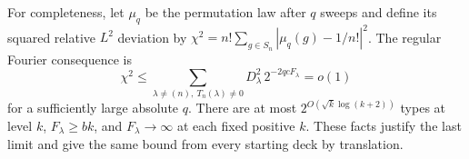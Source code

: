 For completeness, let $\mu_q$ be the permutation law after $q$
sweeps and define its squared relative $L^2$ deviation by
$\chi^2=n!\sum_{g\in S_n}|\mu_q(g)-1/n!|^2$.
The regular Fourier consequence is
\begin{equation}\label{rec:cutoff-fourier-completion}
 \chi^2\le\sum_{\lambda\ne(n),\ T_n(\lambda)\ne0}
             D_\lambda^2\,2^{-2qcF_\lambda}=o(1)
\end{equation}
for a sufficiently large absolute $q$.  There are at most
$2^{O(\sqrt k\log(k+2))}$ types at level $k$, $F_\lambda\ge bk$,
and $F_\lambda\to\infty$ at each fixed positive $k$.
These facts justify the last limit and give the same bound from
every starting deck by translation.

